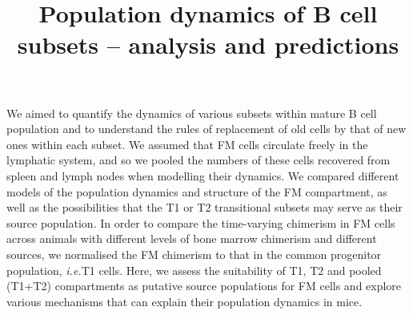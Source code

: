 \documentclass[11pt]{article}
\title{Population dynamics of  B cell subsets -- analysis and predictions}
\author{}
\date{}
\newcommand{\red}[1]{{\color{red}{#1}}}
\newcommand{\ie}{\textit{i.e.}}
\begin{document}
 
	\maketitle
	
	We aimed to quantify the dynamics of various subsets within mature B cell population and to understand the rules of replacement of old cells by that of new ones within each subset.
	We assumed that FM cells circulate freely in the lymphatic system, and so we pooled the numbers of these cells recovered from spleen and lymph nodes when modelling their dynamics.
	We compared different models of the population dynamics and structure of the FM compartment, as well as the possibilities that  the T1 or T2 transitional subsets may serve as their source population.
	In order to compare the time-varying chimerism in FM cells across animals with different levels of bone marrow chimerism and different sources, we normalised the FM chimerism to that in the common progenitor population,  \ie T1 cells.
	Here, we assess the suitability of T1, T2 and pooled (T1+T2) compartments as putative source populations for FM cells and explore various mechanisms that can explain their population dynamics in mice.
	
	
	
	
	
	
	
	
\end{document}
